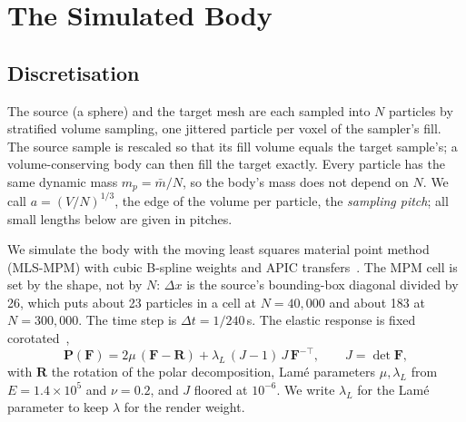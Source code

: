 \section{The Simulated Body}
\label{sec:mpm}

\subsection{Discretisation}
The source (a sphere) and the target mesh are each sampled into $N$ particles by stratified volume sampling, one
jittered particle per voxel of the sampler's fill. The source sample is rescaled so that its fill volume equals the
target sample's; a volume-conserving body can then fill the target exactly. Every particle has the same dynamic
mass $m_p=\bar m/N$, so the body's mass does not depend on $N$. We call $a=(V/N)^{1/3}$, the edge of the volume
per particle, the \emph{sampling pitch}; all small lengths below are given in pitches.

We simulate the body with the moving least squares material point method~\citep{hu2018mlsmpm} (MLS-MPM) with
cubic B-spline weights and APIC transfers~\citep{jiang2016material}. The MPM cell is set by the shape, not by $N$:
$\Delta x$ is the source's bounding-box diagonal divided by 26, which puts about 23 particles in a cell at
$N=40{,}000$ and about 183 at $N=300{,}000$. The time step is $\Delta t=1/240$\,s. The elastic response is fixed
corotated~\citep{2012-FixedCoratedElasticty,stomakhin2013material},
\begin{equation}
\label{eq:fc_stress}
\mathbf{P}(\mathbf{F})=2\mu\,(\mathbf{F}-\mathbf{R})+\lambda_{L}\,(J-1)\,J\,\mathbf{F}^{-\top},
\qquad J=\det\mathbf{F},
\end{equation}
with $\mathbf{R}$ the rotation of the polar decomposition, Lam\'e parameters $\mu,\lambda_L$ from $E=1.4\times10^{5}$
and $\nu=0.2$, and $J$ floored at $10^{-6}$. We write $\lambda_L$ for the Lam\'e parameter to keep $\lambda$ for
the render weight.

